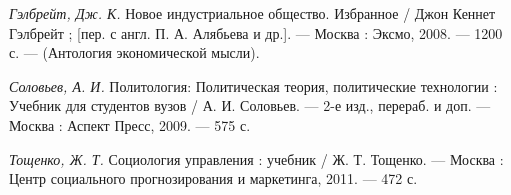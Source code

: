 \textit{Гэлбрейт, Дж. К.} Новое индустриальное общество. Избранное / Джон Кеннет Гэлбрейт ; [пер. с англ. П. А. Алябьева и др.]. --- Москва : Эксмо, 2008. --- 1200 с. --- (Антология экономической мысли).

\textit{Соловьев, А. И.} Политология: Политическая теория, политические технологии : Учебник для студентов вузов / А. И. Соловьев. --- 2-е изд., перераб. и доп. --- Москва : Аспект Пресс, 2009. --- 575 с.

\textit{Тощенко, Ж. Т.} Социология управления : учебник / Ж. Т. Тощенко. --- Москва : Центр социального прогнозирования и маркетинга, 2011. --- 472 с.